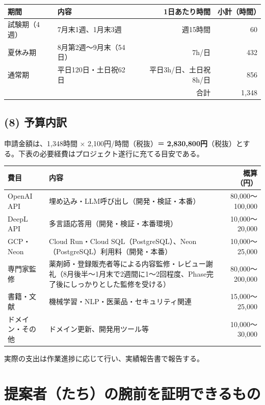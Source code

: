 \documentclass[11pt,a4paper,ja=minimal,xelatex]{bxjsarticle}
\begin{document}
\begin{table}[H]
\centering
\small
\begin{tabular}{@{}llrr@{}}
\toprule
期間 & 内容 & 1日あたり時間 & 小計（時間） \\
\midrule
試験期（4週） & 7月末1週、1月末3週 & 週15時間 & 60 \\
夏休み期 & 8月第2週～9月末（54日） & 7h/日 & 432 \\
通常期 & 平日120日・土日祝62日 & 平日3h/日、土日祝8h/日 & 856 \\
\midrule
\multicolumn{3}{r}{合計} & 1,348 \\
\bottomrule
\end{tabular}
\end{table}

\subsection*{(8) 予算内訳}
申請金額は、1,348時間 × 2,100円/時間（税抜）＝ \textbf{2,830,800円}（税抜）とする。下表の必要経費はプロジェクト遂行に充てる目安である。

\begin{table}[H]
\centering
\begin{tabularx}{\linewidth}{l>{\raggedright\arraybackslash}Xr}
\toprule
費目 & 内容 & 概算（円） \\
\midrule
OpenAI API & 埋め込み・LLM呼び出し（開発・検証・本番） & 80,000～100,000 \\
DeepL API & 多言語応答用（開発・検証・本番環境） & 10,000～20,000 \\
GCP・Neon & Cloud Run・Cloud SQL（PostgreSQL）、Neon（PostgreSQL）利用料（開発・本番） & 10,000～25,000 \\
専門家監修 & 薬剤師・登録販売者等による内容監修・レビュー謝礼（8月後半～1月末で2週間に1～2回程度、Phase完了後にしっかりとした監修を受ける） & 80,000～200,000 \\
書籍・文献 & 機械学習・NLP・医薬品・セキュリティ関連 & 15,000～25,000 \\
ドメイン・その他 & ドメイン更新、開発用ツール等 & 10,000～30,000 \\
\bottomrule
\end{tabularx}
\end{table}

実際の支出は作業進捗に応じて行い、実績報告書で報告する。

\section*{ 提案者（たち）の腕前を証明できるもの}
\end{document}
